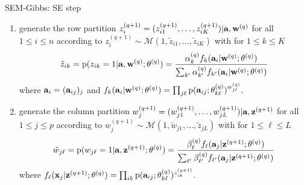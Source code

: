 \documentclass[10pt]{beamer}
\newcommand{\pdf}{\mbox{p}}
\newcommand{\ba}{\bold{a}}
\newcommand{\bx}{\bold{x}}
\newcommand{\bz}{\bold{z}}
\newcommand{\bw}{\bold{w}}
\begin{document}
\begin{frame}{SEM-Gibbs: SE step}
\begin{enumerate}
\item generate the row partition $z_{i}^{(q+1)}=(z_{i1}^{(q+1)},\ldots,z_{iK}^{(q+1)}) |  \ba,\bw^{(q)}$ for all  $1\leq i \leq n$ according to
$
z_{i}^{(q+1)}\sim\mathcal{M}(1,\tilde{z}_{i1},\ldots,\tilde{z}_{iK})
$
with for $1\leq k \leq K$
\begin{eqnarray*}
\tilde{z}_{ik}=\pdf(z_{ik}=1 | \ba, \bw^{(q)} ;\theta^{(q)}) = \frac{ \alpha_{k}^{(q)} f_{k}(\ba_i | \bw^{(q)} ;\theta^{(q)}) }{\sum_{k'}\alpha_{k'}^{(q)} f_{k'}(\ba_i |\bw^{(q)} ;\theta^{(q)})}
\end{eqnarray*}
where $\ba_i=(\ba_{ij})_{j}$ and
$
f_{k}(\ba_i | \bw^{(q)} ;\theta^{(q)})= \prod_{j \ell}  \pdf(\ba_{ij};\theta_{k\ell}^{(q)})^{w_{j\ell}^{(q)}},
$
\item generate the column partition $w_{j}^{(q+1)} =(w_{j1}^{(q+1)},\ldots,w_{jL}^{(q+1)}) |   \ba,\bz^{(q+1)}$ for all  $1\leq j \leq p$ according to
$
w_{j}^{(q+1)}\sim\mathcal{M}(1,\tilde{w}_{j1},\ldots,\tilde{z}_{jL})
$
with for $1\leq \ell \leq L$
\begin{eqnarray*}
\tilde{w}_{j\ell}=\pdf(w_{j\ell}=1 |  \ba,\bz^{(q+1)} ;\theta^{(q)}) = \frac{ \beta_{\ell}^{(q)} f_{\ell}(\ba_j | \bz^{(q+1)} ;\theta^{(q)}) }{\sum_{\ell'}\beta_{\ell'}^{(q)} f_{\ell'}(\ba_j |\bz^{(q+1)} ;\theta^{(q)})}
\end{eqnarray*}
where $f_{\ell}(\bx_j | \bz^{(q+1)} ;\theta^{(q)})= \prod_{ik} \pdf(\ba_{ij};\theta_{k\ell}^{(q)})^{z_{ik}^{(q+1)}}$.
\end{enumerate}
\end{frame}
\end{document}
